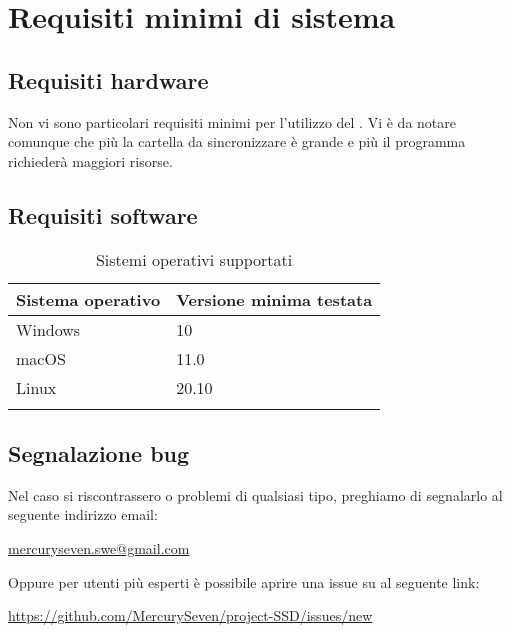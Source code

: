 \section{Requisiti minimi di sistema}

\subsection{Requisiti hardware}

Non vi sono particolari requisiti minimi per l'utilizzo del . Vi è da notare comunque che più la cartella da sincronizzare è grande e più il programma richiederà maggiori risorse.

\subsection{Requisiti software}
{
	\setlength{\freewidth}{\dimexpr\textwidth-1\tabcolsep}
	\renewcommand{\arraystretch}{1.5}
	\setlength{\aboverulesep}{0pt}
	\setlength{\belowrulesep}{0pt}
	\begin{longtable}{L{.210\freewidth} C{.68\freewidth}}
		\textbf{Sistema operativo} & \textbf{Versione minima testata} \\
		\toprule
		\endhead
		Windows & 10 \\
		macOS & 11.0 \\
		Linux & 20.10 \\

		\bottomrule
		\hiderowcolors
		\caption{Sistemi operativi supportati}
	\end{longtable}
}

\subsection{Segnalazione bug}

Nel caso si riscontrassero  o problemi di qualsiasi tipo, preghiamo di segnalarlo al seguente indirizzo email:
\newline{}\centerline{\url{mercuryseven.swe@gmail.com}}
Oppure per utenti più esperti è possibile aprire una issue su  al seguente link:
\newline{}\centerline{\url{https://github.com/MercurySeven/project-SSD/issues/new}}
